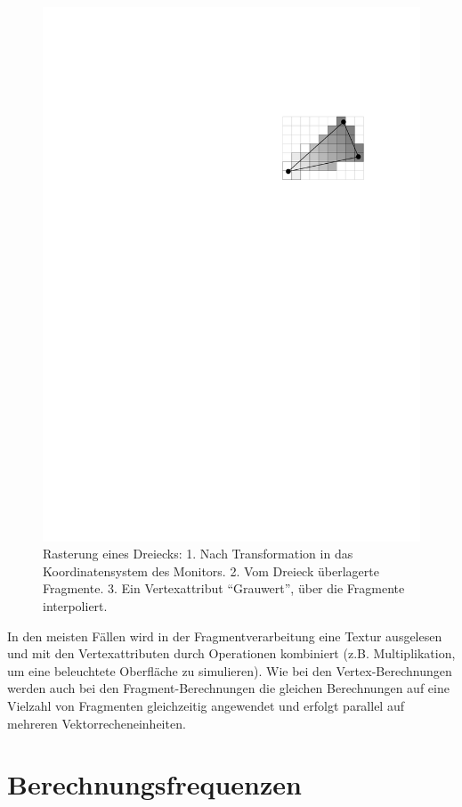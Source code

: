 \documentclass[twoside,a4paper,fleqn,12pt]{book}
\begin{document}
\begin{figure}[h]
  \includegraphics[scale=0.8]{triraster3}
  \caption{Rasterung eines Dreiecks: 1. Nach Transformation in das Koordinatensystem des Monitors.
  2. Vom Dreieck überlagerte Fragmente. 3. Ein Vertexattribut "`Grauwert"', über die Fragmente interpoliert.}
  \label{fig:triraster}
\end{figure}

In den meisten Fällen wird in der Fragmentverarbeitung eine Textur ausgelesen
und mit den Vertexattributen durch Operationen kombiniert (z.B. Multiplikation, um eine beleuchtete Oberfläche zu simulieren).
Wie bei den Vertex-Berechnungen werden auch bei den Fragment-Berechnungen die gleichen Berechnungen auf eine Vielzahl
von Fragmenten gleichzeitig angewendet und erfolgt parallel auf mehreren Vektorrecheneinheiten.

\section{Berechnungsfrequenzen}
\label{berechnungsfrequenz_locker}
\end{document}
